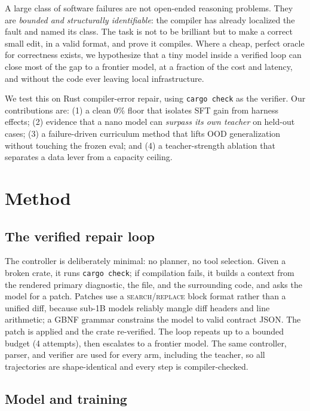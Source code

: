 \documentclass[10pt,twocolumn]{article}
\begin{document}
A large class of software failures are not open-ended reasoning problems. They
are \emph{bounded and structurally identifiable}: the compiler has already
localized the fault and named its class. The task is not to be brilliant but to
make a correct small edit, in a valid format, and prove it compiles. Where a
cheap, perfect oracle for correctness exists, we hypothesize that a tiny model
inside a verified loop can close most of the gap to a frontier model, at a
fraction of the cost and latency, and without the code ever leaving local
infrastructure.

We test this on Rust compiler-error repair, using \texttt{cargo check} as the
verifier. Our contributions are: (1) a clean 0\% floor that isolates SFT gain
from harness effects; (2) evidence that a nano model can \emph{surpass its own
teacher} on held-out cases; (3) a failure-driven curriculum method that lifts OOD
generalization without touching the frozen eval; and (4) a teacher-strength
ablation that separates a data lever from a capacity ceiling.

\section{Method}

\subsection{The verified repair loop}

The controller is deliberately minimal: no planner, no tool selection. Given a
broken crate, it runs \texttt{cargo check}; if compilation fails, it builds a
context from the rendered primary diagnostic, the file, and the surrounding code,
and asks the model for a patch. Patches use a \textsc{search}/\textsc{replace}
block format rather than a unified diff, because sub-1B models reliably mangle
diff headers and line arithmetic; a GBNF grammar constrains the model to valid
contract JSON. The patch is applied and the crate re-verified. The loop repeats
up to a bounded budget (4 attempts), then escalates to a frontier model. The same
controller, parser, and verifier are used for every arm, including the teacher,
so all trajectories are shape-identical and every step is compiler-checked.

\subsection{Model and training}
\end{document}
